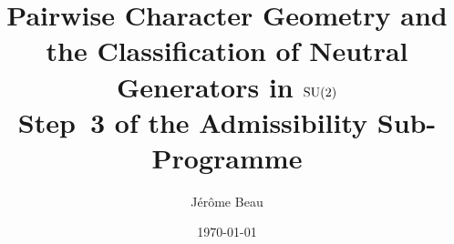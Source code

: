 \documentclass[11pt,a4paper]{article}
\title{Pairwise Character Geometry and the Classification of Neutral Generators in $\mathrm{SU}(2)$\\[4pt]
\large Step~3 of the Admissibility Sub-Programme}
\author{Jérôme Beau}
\date{\today}
\theoremstyle{remark}
\begin{document}
  \maketitle

  \begin{abstract}
    
  \end{abstract}

  \tableofcontents

  
  
  
  
  
  
  
  
  
  

  
      
\end{document}
